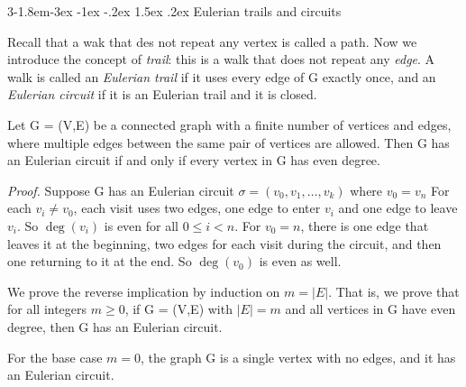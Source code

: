 \documentclass{tufte-handout}
\makeatletter
\renewcommand{\subsection}{\@startsection{subsection}%
    {3}{-1.8em}{-3ex \@plus -1ex \@minus -.2ex}%
    {1.5ex \@plus .2ex}
    {\hspace*{-5.5em}\fcolorbox{ltblue}{ltblue}{\parbox[c][1.0ex][b]{4em}{\phantom{space}}}
    \normalfont\large\itshape\color{ltblue}}}
\makeatother
\begin{document}
\subsection{Eulerian trails and circuits}

Recall that a wak that des not repeat any vertex is called a path. Now we introduce the concept of
\textit{trail}: this is a walk that does not repeat any \textit{edge}.
A walk is called an \textit{Eulerian trail} if it uses every edge of G exactly once, and an
\textit{Eulerian circuit} if it is an Eulerian trail and it is closed.



\begin{Theorem}
    Let G = (V,E) be a connected graph with a finite number of vertices and edges, where
    multiple edges between the same pair of vertices are allowed. Then G has an Eulerian circuit
    if and only if every vertex in G has even degree.
\end{Theorem}

\textit{Proof.} Suppose G has an Eulerian circuit \(\sigma = (v_0, v_1, \ldots, v_k)\) where \( v_0=v_n \)
For each \( v_i \neq v_0 \), each visit uses two edges, one edge to enter \( v_i \) and one edge to leave \( v_i \).
So \( \deg(v_i) \) is even for all \( 0\leq i < n \). For \( v_0 = n \), there is one edge that leaves it at the
beginning, two edges for each visit during the circuit, and then one returning to it at the end. 
So \( \deg(v_0) \) is even as well.

We prove the reverse implication by induction on \( m = \left|E\right| \). That is,
we prove that for all integers \( m \geq 0 \), if G = (V,E) with \(\left|E\right| = m\) and all
vertices in G have even degree, then G has an Eulerian circuit.

For the base case \( m = 0 \), the graph G is a single vertex with no edges, and it has an Eulerian circuit.
\end{document}
